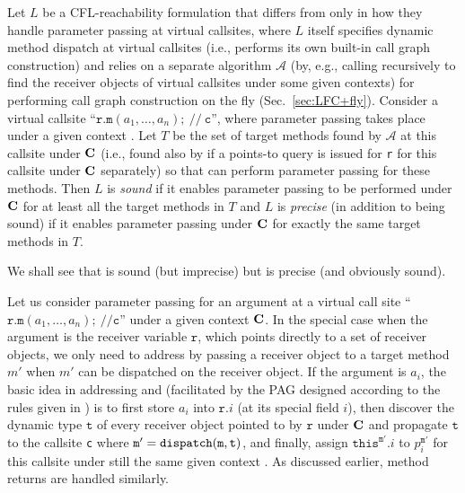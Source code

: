 \begin{defn}
\label{def:sound-prec}
Let $L$ be a CFL-reachability formulation that differs from \manuLFC only in
how they handle parameter passing at
virtual callsites, where $L$ itself specifies dynamic method dispatch at virtual callsites
(i.e., performs its 
own built-in
call graph construction) and \manuLFC relies on a separate algorithm $\mathcal{A}$ (by, e.g., calling
\manuLFC recursively to find the receiver objects of virtual callsites under some given contexts)  for performing call graph construction on the fly (Sec.~\ref{sec:LFC+fly}).
Consider a virtual callsite
``$\mathtt{r}.\mathtt{m}(a_1, \dots, a_n); ~ //~ \mathtt{c}$'', where parameter passing  takes place under a given context \CC. Let $T$ be the set of
target methods found by $\mathcal{A}$
at this callsite under $\textbf{C}$ (i.e., found also by \manuLFC if a points-to query is issued
for \texttt{r}
for this callsite under $\textbf{C}$ separately)
so that \manuLFC can
perform parameter passing for these methods. Then
$L$ is  \emph{sound} if it  enables parameter passing  to be performed
under $\textbf{C}$ for at least all
the target methods in $T$ and $L$ is \emph{precise} (in addition to being
sound) if it  enables parameter passing under $\textbf{C}$ for exactly the
same target methods in $T$. 
\end{defn}
We shall see that \LFC is  sound (but imprecise) but \LFCR is  precise 
(and obviously  sound).

Let us
consider parameter passing for an argument at a virtual call site
``$\mathtt{r}.\mathtt{m}(a_1, \dots, a_n); ~ // \mathtt{c}$'' 
under a given context $\textbf{C}$. In the special case when
 the argument is the receiver variable $\mathtt{r}$, which points  directly to a set of receiver objects, we only need to address  by passing a receiver object
to a target method $m'$ when $m'$ can be dispatched on the receiver object.
If the argument is $a_i$,
the basic idea in addressing
  and  (facilitated by the PAG designed 
 according to
 the rules given in 
 )
is to first store  $a_i$  into $\mathtt{r}.i$ (at its special field $i$), then discover the dynamic type $\texttt{t}$ of every receiver object
pointed to by $\mathtt{r}$ under $\textbf{C}$ and propagate $\texttt{t}$ to the callsite \texttt{c} where $ \mathtt{m'} = \texttt{dispatch}(\texttt{m}, \texttt{t})$,
and finally, assign
$\texttt{this}^{\mathtt{m}'}.i$ to $p_i^{\mathtt{m}'}$ for this callsite under
still the same given context \CC. As discussed earlier, method returns are
handled similarly.

